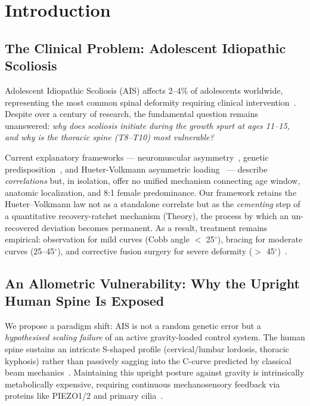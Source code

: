 
\section{Introduction}

\subsection{The Clinical Problem: Adolescent Idiopathic Scoliosis}
Adolescent Idiopathic Scoliosis (AIS) affects 2--4\% of adolescents worldwide, representing the most common spinal deformity requiring clinical intervention~\cite{weinstein2008adolescent, negrini2018scientific}. Despite over a century of research, the fundamental question remains unanswered: \textit{why does scoliosis initiate during the growth spurt at ages 11--15, and why is the thoracic spine (T8--T10) most vulnerable?}

Current explanatory frameworks --- neuromuscular asymmetry~\cite{cheng2015ais}, genetic predisposition~\cite{grauers2012genetics}, and Hueter-Volkmann asymmetric loading~\cite{stokes2007growth} --- describe \textit{correlations} but, in isolation, offer no unified mechanism connecting age window, anatomic localization, and 8:1 female predominance. Our framework retains the Hueter--Volkmann law not as a standalone correlate but as the \emph{cementing} step of a quantitative recovery-ratchet mechanism (Theory), the process by which an un-recovered deviation becomes permanent. As a result, treatment remains empirical: observation for mild curves (Cobb angle $<$ 25$^{\circ}$), bracing for moderate curves (25--45$^{\circ}$), and corrective fusion surgery for severe deformity ($>$ 45$^{\circ}$)~\cite{weinstein2013bracing}.

\subsection{An Allometric Vulnerability: Why the Upright Human Spine Is Exposed}
We propose a paradigm shift: AIS is not a random genetic error but a \textit{hypothesised scaling failure} of an active gravity-loaded control system. The human spine sustains an intricate S-shaped profile (cervical/lumbar lordosis, thoracic kyphosis) rather than passively sagging into the C-curve predicted by classical beam mechanics~\cite{white1990clinical, goriely2017mathematics}. Maintaining this upright posture against gravity is intrinsically metabolically expensive, requiring continuous mechanosensory feedback via proteins like PIEZO1/2 and primary cilia~\cite{assaraf2020piezo2, coste2010piezo, lv2023yap}.

